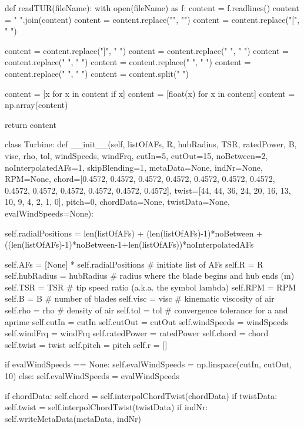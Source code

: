 \begin{pythoncode}
def readTUR(fileName):
    with open(fileName) as f:
        content = f.readlines()
        content = "   ".join(content)
        content = content.replace("\n", "")
        content = content.replace("[", " ")
        
        content = content.replace("]", " ")
        content = content.replace("     ", " ")
        content = content.replace("    ", " ")
        content = content.replace("   ", " ")
        content = content.replace("  ", " ")
        content = content.split(" ")
        
        content = [x for x in content if x]
        content = [float(x) for x in content]
        content = np.array(content)
       
        
        return content


class Turbine:
    def __init__(self, listOfAFs, R, hubRadius, TSR, ratedPower, B, visc, rho, tol, windSpeeds, 
                 windFrq, cutIn=5, cutOut=15, noBetween=2, noInterpolatedAFs=1, 
                 skipBlending=1, metaData=None, indNr=None, RPM=None,
                 chord=[0.4572,  0.4572, 0.4572, 0.4572, 0.4572, 0.4572, 0.4572, 0.4572, 0.4572, 0.4572, 0.4572, 0.4572, 0.4572], 
                 twist=[44, 44, 36, 24, 20, 16, 13, 10, 9, 4, 2, 1, 0], pitch=0,
                 chordData=None, twistData=None,
                 evalWindSpeeds=None):

        self.radialPositions = len(listOfAFs) + (len(listOfAFs)-1)*noBetween + ((len(listOfAFs)-1)*noBetween-1+len(listOfAFs))*noInterpolatedAFs

        self.AFs = [None] * self.radialPositions # initiate list of AFs
        self.R = R
        self.hubRadius = hubRadius # radius where the blade begins and hub ends (m)
        self.TSR = TSR # tip speed ratio (a.k.a. the symbol lambda)
        self.RPM = RPM
        self.B = B # number of blades
        self.visc = visc # kinematic viscosity of air 
        self.rho = rho # density of air 
        self.tol = tol # convergence tolerance for a and aprime
        self.cutIn = cutIn
        self.cutOut = cutOut
        self.windSpeeds = windSpeeds
        self.windFrq = windFrq
        self.ratedPower = ratedPower
        self.chord = chord
        self.twist = twist
        self.pitch = pitch
        self.r = []

        if evalWindSpeeds == None:
            self.evalWindSpeeds = np.linspace(cutIn, cutOut, 10)
        else:
            self.evalWindSpeeds = evalWindSpeeds

        if chordData:
            self.chord = self.interpolChordTwist(chordData)
        if twistData:
            self.twist = self.interpolChordTwist(twistData)
        if indNr:
            self.writeMetaData(metaData, indNr)


\end{pythoncode}
